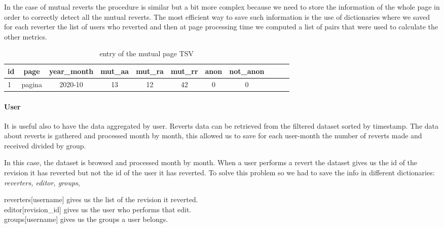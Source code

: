 In the case of mutual reverts the procedure is similar but a bit more complex because we need to
store the information of the whole page in order to correctly detect all the mutual reverts. 
The most efficient way to save such information is the use of dictionaries where we saved for each
reverter the list of users who reverted and then at page processing time we computed a list of pairs
that were used to calculate the other metrics.

\begin{table}[H]
    \centering
    \begin{tabularx}{\columnwidth}{@{}Xcccccccccc@{}}
        \midrule
        \textbf{id} & \textbf{page} & \textbf{year\_month} & \textbf{mut\_aa} & \textbf{mut\_ra}  & \textbf{mut\_rr} & \textbf{anon} & \textbf{not\_anon}\\ \toprule
        1 & pagina & 2020-10 & 13 & 12 & 42  & 0 & 0 \\
         \bottomrule
    \end{tabularx}
    
    \caption{entry of the mutual page TSV \label{table:mutualpage}}
\end{table}

\paragraph*{User}
It is useful also to have the data aggregated by user. Reverts data can be retrieved from the
filtered dataset sorted by timestamp. The data about reverts is gathered and processed month by
month, this allowed us to save for each user-month the number of reverts made and received divided
by group.

In this case, the dataset is browsed and processed month by month. When a user performs a revert the
dataset gives us the id of the revision it has reverted but not the id of the user it has
reverted. To solve this problem so we had to save the info in different dictionaries: \textit{reverters, editor, groups}, 
\bigskip

reverters[username] gives us the list of the revision it reverted. \\
\indent editor[revision\_id] gives us the user who performs that edit. \\
\indent groups[username] gives us the groups a user belongs.\\


